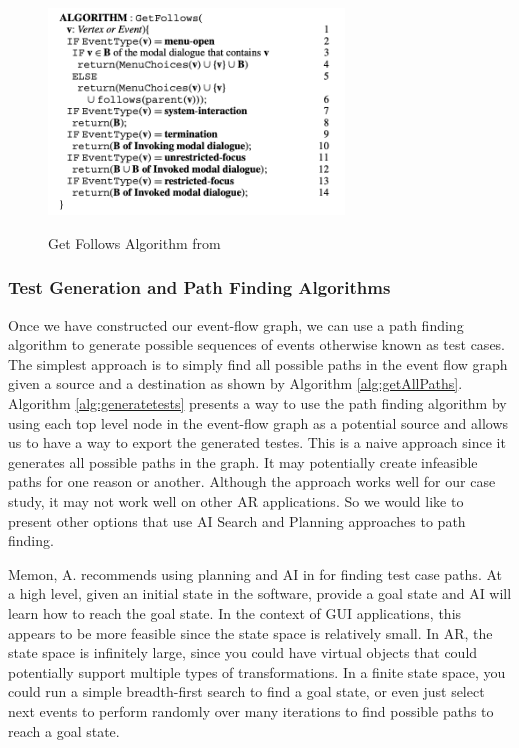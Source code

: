 \documentclass[final,3p]{CSP}
\begin{document}
\begin{figure}[h]
\caption{Get Follows Algorithm from \cite{EventFlow}} 
\centering
\includegraphics[width=0.7\textwidth]{getfollows.png}
\label{alg:gui-getFollows}
\end{figure}

\subsubsection{Test Generation and Path Finding Algorithms}
\noindent

Once we have constructed our event-flow graph, we can use a path finding algorithm to generate possible sequences of events otherwise known as test cases.  The simplest approach is to simply find all possible paths in the event flow graph given a source and a destination as shown by Algorithm \ref{alg:getAllPaths}.  Algorithm \ref{alg:generatetests}
 presents a way to use the path finding algorithm by using each top level node in the event-flow graph as a potential source and allows us to have a way to export the generated testes.  This is a naive approach since it generates all possible paths in the graph.  It may potentially create infeasible paths for one reason or another.  Although the approach works well for our case study, it may not work well on other AR applications.  So we would like to present other options that use AI Search and Planning approaches to path finding.
 
Memon, A. recommends using planning and AI in \cite{framework} for finding test case paths.  At a high level, given an initial state in the software, provide a goal state and AI will learn how to reach the goal state.  In the context of GUI applications, this appears to be more feasible since the state space is relatively small.  In AR, the state space is infinitely large, since you could have virtual objects that could potentially support multiple types of transformations.  In a finite state space, you could run a simple breadth-first search to find a goal state, or even just select next events to perform randomly over many iterations to find possible paths to reach a goal state.
\end{document}
